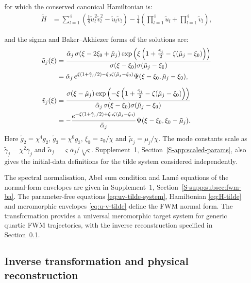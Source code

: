 \documentclass{optica-article}
\numberwithin{equation}{section}
\begin{document}
for which the conserved canonical Hamiltonian is:
\begin{align}
\tilde{H} &= \sum_{l=1}^{4} \left(\frac{1}{8} \tilde{u}^{2}_l \tilde{v}^{2}_l  - \tilde{u}_l \tilde{v}_l \right) - \frac{1}{4}\left(\prod_{l=1}^{4} \tilde{u}_l + \prod_{l=1}^{4} \tilde{v}_l\right), \label{eq:H-tilde}
\end{align}

and the sigma and Baker--Akhiezer forms of the solutions are:
\begin{align}
\tilde{u}_j{\left(\xi\right)} &= \frac{\tilde{\alpha}_{j} \,\sigma{\left(\xi - 2 \xi_{0} + {\tilde{\mu}}_{j}\right)} \exp\left({\xi \left( 1 + \frac{{\tilde{\gamma}}_{j}}{2} - \zeta{\left( {\tilde{\mu}}_{j} - \xi_{0}\right)}\right)}\right)}{\sigma{\left(\xi - \xi_{0}\right)} \sigma{\left( {\tilde{\mu}}_{j} - \xi_{0}\right)}} \notag \\
&=\tilde\alpha_j\,
 e^{\xi(1+\tilde\gamma_j/2)-\xi_0\zeta(\tilde\mu_j-\xi_0)}
 \Psi(\xi-\xi_0,\tilde\mu_j-\xi_0),\notag\\[6pt]
\tilde{v}_j{\left(\xi\right)} &= \frac{ \sigma{\left(\xi - {\tilde{\mu}}_{j}\right)} \exp\left({-\xi \left( 1 + \frac{{\tilde{\gamma}}_{j}}{2} - \zeta{\left( {\tilde{\mu}}_{j} - \xi_{0}\right)}\right)}\right)}{\tilde{\alpha}_{j} \,\sigma{\left(\xi - \xi_{0}\right)} \sigma{\left( {\tilde{\mu}}_{j} - \xi_{0}\right)}}  \notag\\
&=-\frac{e^{-\xi(1+\tilde\gamma_j/2)+\xi_0\zeta(\tilde\mu_j-\xi_0)}}{\tilde\alpha_j}
\Psi(\xi-\xi_0,\xi_0-\tilde\mu_j).
\label{eq:u-v-tilde}
\end{align}
Here $\tilde g_2=\chi^4g_2$, $\tilde g_3=\chi^6g_3$, $\xi_0=z_0/\chi$ and $\tilde\mu_j=\mu_j/\chi$.
The mode constants scale as $\tilde\gamma_j=\chi^2\bar\gamma_j$ and $\tilde\alpha_j=\varsigma\bar\alpha_j/\sqrt[4]{\varsigma}$.
Supplement~1, Section~\ref*{S-app:scaled-params}, also gives the initial-data definitions for the tilde system considered independently.

The spectral normalisation, Abel sum condition and Lam\'e equations of the normal-form envelopes are given in Supplement~1, Section~\ref*{S-supp:subsec:fwm-ba}.
The parameter-free equations \eqref{eq:uv-tilde-system}, Hamiltonian \eqref{eq:H-tilde} and meromorphic envelopes \eqref{eq:u-v-tilde} define the FWM normal form.
The transformation provides a universal meromorphic target system for generic quartic FWM trajectories, with the inverse reconstruction specified in Section~\ref{subsec:transform-domain}.

\subsection{Inverse transformation and physical reconstruction}
\label{subsec:transform-domain}
\end{document}
